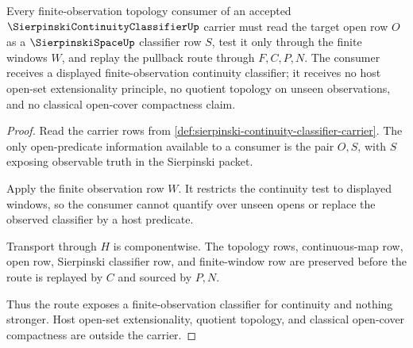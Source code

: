 \begin{theorem}
\label{thm:sierpinski-continuity-classifier-finite-observation-route}
Every finite-observation topology consumer of an accepted $\SierpinskiContinuityClassifierUp$ carrier must read the target open row $O$ as a $\SierpinskiSpaceUp$ classifier row $S$, test it only through the finite windows $W$, and replay the pullback route through $F,C,P,N$. The consumer receives a displayed finite-observation continuity classifier; it receives no host open-set extensionality principle, no quotient topology on unseen observations, and no classical open-cover compactness claim.
\end{theorem}
\begin{proof}
Read the carrier rows from \autoref{def:sierpinski-continuity-classifier-carrier}. The only open-predicate information available to a consumer is the pair $O,S$, with $S$ exposing observable truth in the Sierpinski packet.

Apply the finite observation row $W$. It restricts the continuity test to displayed windows, so the consumer cannot quantify over unseen opens or replace the observed classifier by a host predicate.

Transport through $H$ is componentwise. The topology rows, continuous-map row, open row, Sierpinski classifier row, and finite-window row are preserved before the route is replayed by $C$ and sourced by $P,N$.

Thus the route exposes a finite-observation classifier for continuity and nothing stronger. Host open-set extensionality, quotient topology, and classical open-cover compactness are outside the carrier.
\end{proof}



